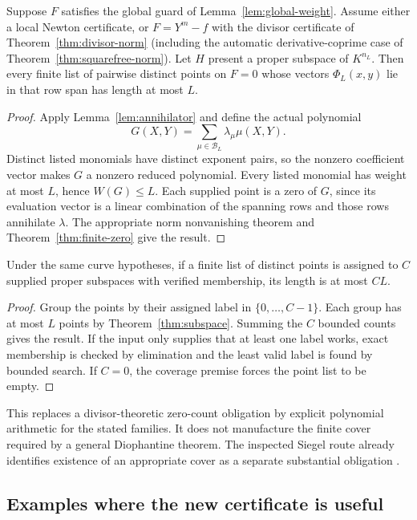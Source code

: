 \begin{theorem}\label{thm:subspace}
Suppose $F$ satisfies the global guard of Lemma~\ref{lem:global-weight}. Assume either a local Newton certificate, or $F=Y^m-f$ with the divisor certificate of Theorem~\ref{thm:divisor-norm} (including the automatic derivative-coprime case of Theorem~\ref{thm:squarefree-norm}). Let $H$ present a proper subspace of $K^{n_L}$. Then every finite list of pairwise distinct points on $F=0$ whose vectors $\Phi_L(x,y)$ lie in that row span has length at most $L$.
\end{theorem}
\begin{proof}
Apply Lemma~\ref{lem:annihilator} and define the actual polynomial
\[
 G(X,Y)=\sum_{\mu\in\mathcal B_L}\lambda_\mu\mu(X,Y).
\]
Distinct listed monomials have distinct exponent pairs, so the nonzero coefficient vector makes $G$ a nonzero reduced polynomial. Every listed monomial has weight at most $L$, hence $W(G)\le L$. Each supplied point is a zero of $G$, since its evaluation vector is a linear combination of the spanning rows and those rows annihilate $\lambda$. The appropriate norm nonvanishing theorem and Theorem~\ref{thm:finite-zero} give the result.
\end{proof}

\begin{corollary}\label{cor:cover}
Under the same curve hypotheses, if a finite list of distinct points is assigned to $C$ supplied proper subspaces with verified membership, its length is at most $CL$.
\end{corollary}
\begin{proof}
Group the points by their assigned label in $\{0,\ldots,C-1\}$. Each group has at most $L$ points by Theorem~\ref{thm:subspace}. Summing the $C$ bounded counts gives the result. If the input only supplies that at least one label works, exact membership is checked by elimination and the least valid label is found by bounded search. If $C=0$, the coverage premise forces the point list to be empty.
\end{proof}

This replaces a divisor-theoretic zero-count obligation by explicit polynomial arithmetic for the stated families. It does not manufacture the finite cover required by a general Diophantine theorem. The inspected Siegel route already identifies existence of an appropriate cover as a separate substantial obligation \cite{repo-siegel}.

\subsection{Examples where the new certificate is useful}

